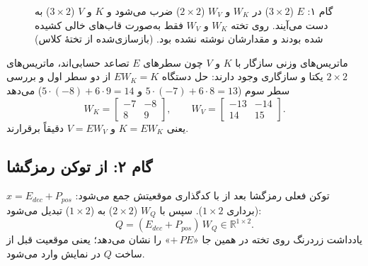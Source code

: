 \begin{figure}[htbp]
\centering
{}
\caption{گام ۱: $E$ ($3\times2$) در $W_K$ و $W_V$ ($2\times2$) ضرب می‌شود و $K$ و $V$ ($3\times2$) به دست می‌آیند. روی تخته $W_K$ و $W_V$ فقط به‌صورت قاب‌های خالی کشیده شده بودند و مقدارشان نوشته نشده بود. (بازسازی‌شده از تختهٔ کلاس)}
\end{figure}

\begin{addedbox}{ماتریس‌های وزنی سازگار با $K$ و $V$}
چون سطرهای $E$ تصاعد حسابی‌اند، ماتریس‌های $2\times2$ یکتا و سازگاری وجود دارند: حل دستگاه $EW_K=K$ از دو سطر اول و بررسی سطر سوم ($5\cdot(-7)+6\cdot 8=13$ و $5\cdot(-8)+6\cdot 9=14$) می‌دهد
\[
W_K=\begin{bmatrix}-7&-8\\8&9\end{bmatrix},\qquad
W_V=\begin{bmatrix}-13&-14\\14&15\end{bmatrix}.
\]
یعنی $K=EW_K$ و $V=EW_V$ دقیقاً برقرارند.
\end{addedbox}

\subsection{گام ۲:  از توکن رمزگشا}
توکن فعلی رمزگشا بعد از  با کدگذاری موقعیتش جمع می‌شود: $x=E_{dec}+P_{pos}$ (برداری $1\times2$). سپس با $W_Q$ ($2\times2$) به  ($1\times 2$) تبدیل می‌شود:
\[
Q = (E_{dec}+P_{pos})\,W_Q\in\mathbb{R}^{1\times 2}.
\]
یادداشت زردرنگ روی تخته در همین جا «$+\,PE$» را نشان می‌دهد؛ یعنی موقعیت قبل از ساخت $Q$ در نمایش وارد می‌شود.

